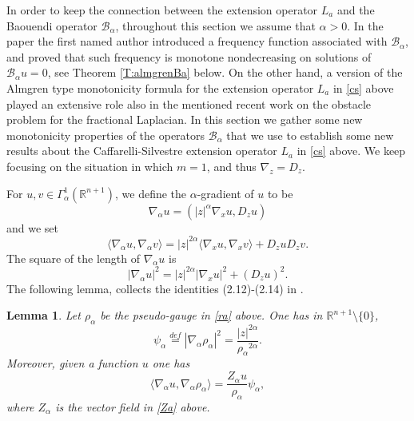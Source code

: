 \documentclass[11pt]{amsart}
\theoremstyle{plain}
\newtheorem{lemma}[thrm]{Lemma}
\numberwithin{equation}{section}
\begin{document}
In order to keep the connection between the extension operator $L_a$ and the Baouendi operator ${\mathcal{B}_\alpha}$, throughout this section we assume that $\alpha>0$. In the paper \cite{G} the first named author introduced a frequency function associated with ${\mathcal{B}_\alpha}$, and proved that such frequency is monotone nondecreasing on solutions of ${\mathcal{B}_\alpha} u = 0$, see Theorem \ref{T:almgrenBa} below. On the other hand, a version of the Almgren type monotonicity formula for the extension operator $L_a$ in \eqref{cs} above played an extensive role also in the mentioned recent work \cite{CSS} on the obstacle problem for the fractional Laplacian. In this section we gather some new monotonicity properties of the operators ${\mathcal{B}_\alpha}$ that we use to establish some new results about the Caffarelli-Silvestre extension operator $L_a$ in \eqref{cs} above. We keep focusing on the situation in which $m=1$, and thus $\nabla_z = D_z$.

For $u, v\in \Gamma^1_\alpha({\mathbb R}^{n+1})$, we define the $\alpha$-gradient of $u$ to be
\begin{equation*}
 \nabla_\alpha u= \left(|z|^\alpha \nabla_x u, D_z u\right)
\end{equation*}
and we set
\[
\langle{\nabla_\alpha} u,{\nabla_\alpha} v\rangle =  |z|^{2\alpha} \langle\nabla_x u,\nabla_x v\rangle + D_z u D_z v.
\]
The square of the length of $\nabla_\alpha u$ is
\begin{equation}\label{carre}
 |\nabla_\alpha u|^2= |z|^{2\alpha} |\nabla_x u|^2 + (D_z u)^2.
\end{equation}
The following lemma, collects the identities (2.12)-(2.14) in \cite{G}.

\begin{lemma}\label{l:gradalpharho}
Let ${\rho_\alpha}$ be the pseudo-gauge in \eqref{ra} above. One has in ${\mathbb R}^{n+1}\setminus\{0\}$,
 \begin{equation}\label{nara}
  \psi_{\alpha} \overset{def}{=} |{\nabla_\alpha} {\rho_\alpha}|^2 = \frac{|z|^{2\alpha}}{{\rho_\alpha}^{2\alpha}}.
 \end{equation}
Moreover, given a function $u$ one has
 \begin{equation}\label{nara2}
 \langle{\nabla_\alpha} u,{\nabla_\alpha} {\rho_\alpha}\rangle = \frac{{Z_\alpha} u}{\rho_\alpha} \psi_\alpha,
 \end{equation}
 where $Z_\alpha$ is the vector field in \eqref{Za} above.
 \end{lemma}
\end{document}
